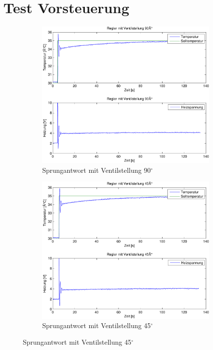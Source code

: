 \section{Test Vorsteuerung}
\begin{figure}[h!]
    \centering
    \begin{subfigure}{0.475\textwidth}
        \includegraphics[width=1\textwidth]{11/vorsteuerung_full_plot.pdf}
        \caption{Sprungantwort mit Ventilstellung 90$^\circ$}
        \label{fig:11a}
    \end{subfigure}
    \hfill{}
    \begin{subfigure}{0.475\textwidth}
        \includegraphics[width=1\textwidth]{11/vorsteuerung_half_plot.pdf}
        \caption{Sprungantwort mit Ventilstellung 45$^\circ$}
        \label{fig:11b}
    \end{subfigure}
\end{figure}
